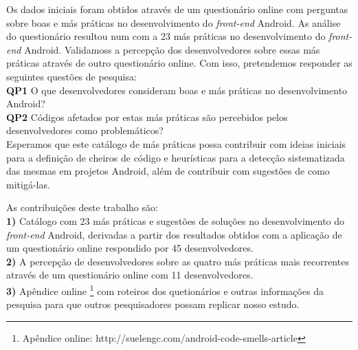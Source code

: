 Os dados iniciais foram obtidos através de um questionário online com perguntas sobre boas e más práticas no desenvolvimento do \textit{front-end} Android. As análise do questionário resultou num com a 23 más práticas no desenvolvimento do \textit{front-end} Android. Validamoss a percepção dos desenvolvedores sobre essas más práticas através de outro questionário online. Com isso, pretendemos responder as seguintes questões de pesquisa: \\

\textbf{QP1} O que desenvolvedores consideram boas e más práticas no desenvolvimento Android? \\

\textbf{QP2} Códigos afetados por estas más práticas são percebidos pelos desenvolvedores como problemáticos? \\

Esperamos que este catálogo de más práticas possa contribuir com ideias iniciais para a definição de cheiros de código e heurísticas para a detecção sistematizada das mesmas em projetos Android, além de contribuir com sugestões de como mitigá-las.

As contribuições deste trabalho são: \\

\textbf{1)} Catálogo com 23 más práticas e sugestões de soluções no desenvolvimento do \textit{front-end} Android, derivadas a partir dos resultados obtidos com a aplicação de um questionário online respondido por 45 desenvolvedores. \\

\textbf{2)} A percepção de desenvolvedores sobre as quatro más práticas mais recorrentes através de um questionário online com 11 desenvolvedores. \\

\textbf{3)} Apêndice online \footnote{Apêndice online: http://suelengc.com/android-code-smells-article} com roteiros dos quetionários e outras informações da pesquisa para que outros pesquisadores possam replicar nosso estudo. \\



